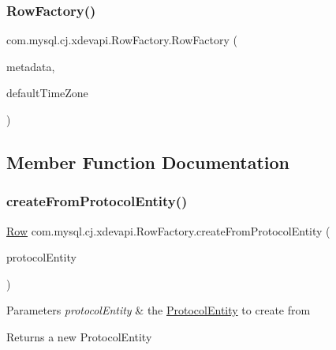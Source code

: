 \subsubsection{\texorpdfstring{Row\+Factory()}{RowFactory()}}
{\footnotesize\ttfamily com.\+mysql.\+cj.\+xdevapi.\+Row\+Factory.\+Row\+Factory (\begin{DoxyParamCaption}\item[{\mbox{\hyperlink{interfacecom_1_1mysql_1_1cj_1_1protocol_1_1_column_definition}{Column\+Definition}}}]{metadata,  }\item[{Time\+Zone}]{default\+Time\+Zone }\end{DoxyParamCaption})}



\subsection{Member Function Documentation}
\mbox{\label{classcom_1_1mysql_1_1cj_1_1xdevapi_1_1_row_factory_a4320a0bcea400bcd2324daf031ee752f}} 
\subsubsection{\texorpdfstring{create\+From\+Protocol\+Entity()}{createFromProtocolEntity()}}
{\footnotesize\ttfamily \mbox{\hyperlink{interfacecom_1_1mysql_1_1cj_1_1result_1_1_row}{Row}} com.\+mysql.\+cj.\+xdevapi.\+Row\+Factory.\+create\+From\+Protocol\+Entity (\begin{DoxyParamCaption}\item[{\mbox{\hyperlink{interfacecom_1_1mysql_1_1cj_1_1protocol_1_1_protocol_entity}{Protocol\+Entity}}}]{protocol\+Entity }\end{DoxyParamCaption})}


\begin{DoxyParams}{Parameters}
{\em protocol\+Entity} & the \mbox{\hyperlink{}{Protocol\+Entity}} to create from \\
\hline
\end{DoxyParams}
\begin{DoxyReturn}{Returns}
a new Protocol\+Entity 
\end{DoxyReturn}


